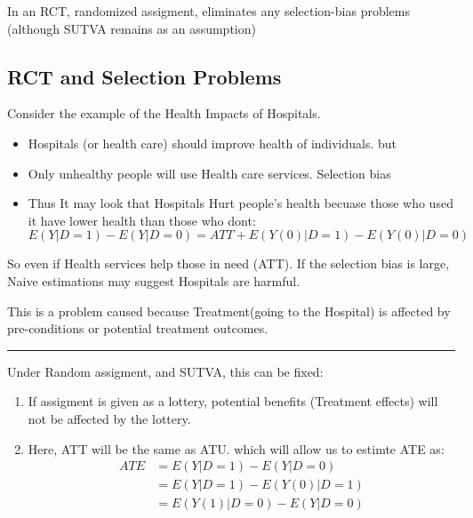 \documentclass[
  letterpaper,
  DIV=11,
  numbers=noendperiod]{scrartcl}
\providecommand{\tightlist}{%
  \setlength{\itemsep}{0pt}\setlength{\parskip}{0pt}}\usepackage{longtable,booktabs,array}
\begin{document}
In an RCT, randomized assigment, eliminates any selection-bias problems
(although SUTVA remains as an assumption)

\hypertarget{rct-and-selection-problems}{%
\subsection{RCT and Selection
Problems}\label{rct-and-selection-problems}}

Consider the example of the Health Impacts of Hospitals.

\begin{itemize}
\tightlist
\item
  Hospitals (or health care) should improve health of individuals. but
\item
  Only unhealthy people will use Health care services. Selection bias
\item
  Thus It may look that Hospitals Hurt people's health becuase those who
  used it have lower health than those who dont: \[ 
  E(Y|D=1)-E(Y|D=0) = ATT + E(Y(0)|D=1)-E(Y(0)|D=0)
  \]
\end{itemize}

So even if Health services help those in need (ATT). If the selection
bias is large, Naive estimations may suggest Hospitals are harmful.

This is a problem caused because Treatment(going to the Hospital) is
affected by pre-conditions or potential treatment outcomes.

\begin{center}\rule{0.5\linewidth}{0.5pt}\end{center}

Under Random assigment, and SUTVA, this can be fixed:

\begin{enumerate}
\def\labelenumi{\arabic{enumi}.}
\tightlist
\item
  If assigment is given as a lottery, potential benefits (Treatment
  effects) will not be affected by the lottery.
\item
  Here, ATT will be the same as ATU. which will allow us to estimte ATE
  as: \[
  \begin{aligned}
  ATE &= E(Y|D=1)-E(Y|D=0) \\
   &= E(Y|D=1)-E(Y(0)|D=1) \\
   &= E(Y(1)|D=0)-E(Y|D=0) \\
  \end{aligned}
  \]
\end{enumerate}
\end{document}
